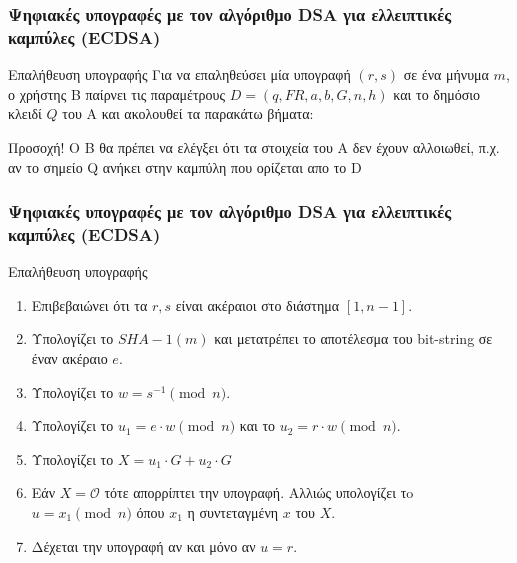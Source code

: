 \documentclass{beamer}
\begin{document}
%
\begin{frame}
\frametitle{Ψηφιακές υπογραφές με τον αλγόριθμο DSA για ελλειπτικές καμπύλες (ECDSA)}
\begin{block}
{Επαλήθευση υπογραφής}
Για να επαληθεύσει μία υπογραφή $(r,s)$ σε ένα μήνυμα $m$, ο χρήστης Β παίρνει τις παραμέτρους $D = (q, FR, a, b, G, n, h)$ και το δημόσιο κλειδί $Q$ του Α και ακολουθεί τα παρακάτω βήματα:
\end{block}
\alert{Προσοχή! Ο Β θα πρέπει να ελέγξει ότι τα στοιχεία του Α δεν έχουν αλλοιωθεί, π.χ. αν το σημείο Q ανήκει στην καμπύλη που ορίζεται απο το D}
\end{frame}

%
\begin{frame}
\frametitle{Ψηφιακές υπογραφές με τον αλγόριθμο DSA για ελλειπτικές καμπύλες (ECDSA)}
\begin{block}
{Επαλήθευση υπογραφής}
\begin{small}
\begin{enumerate}
\item Επιβεβαιώνει ότι τα $r,s$ είναι ακέραιοι στο διάστημα $[1, n-1]$.
\item Υπολογίζει το $SHA-1(m)$ και μετατρέπει το αποτέλεσμα του bit-string σε έναν ακέραιο $e$.
\item Υπολογίζει το $w = s^{-1} \pmod n$.
\item Υπολογίζει το $u_1 = e \cdot w \pmod n$ και το $u_2 = r \cdot w \pmod n$.
\item Υπολογίζει το $X = u_1 \cdot G + u_2 \cdot G$
\item Εάν $X = \mathcal{O}$ τότε απορρίπτει την υπογραφή. Αλλιώς υπολογίζει τo $u = x_1 \pmod n$ όπου $x_1$ η συντεταγμένη $x$ του $X$. 
\item Δέχεται την υπογραφή αν και μόνο αν $u = r$.
\end{enumerate}
\end{small}
\end{block}
\end{frame}
\end{document}

